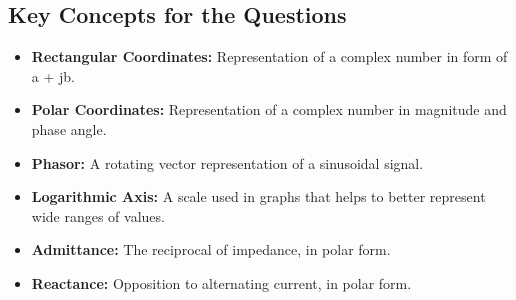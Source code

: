 \subsection*{Key Concepts for the Questions}
\begin{itemize}
    \item \textbf{Rectangular Coordinates:} Representation of a complex number in form of a + jb.
        \item \textbf{Polar Coordinates:} Representation of a complex number in magnitude and phase angle.
    \item \textbf{Phasor:} A rotating vector representation of a sinusoidal signal.
        \item \textbf{Logarithmic Axis:} A scale used in graphs that helps to better represent wide ranges of values.
     \item \textbf{Admittance:}  The reciprocal of impedance, in polar form.
      \item \textbf{Reactance:}  Opposition to alternating current, in polar form.

\end{itemize}

